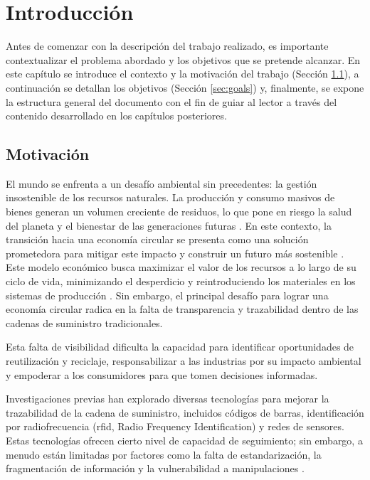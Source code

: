 \chapter[Introducción]{Introducción}
\label{cp:introduction}

\parindent0pt

Antes de comenzar con la descripción del trabajo realizado, es importante contextualizar el problema abordado y los objetivos que se pretende alcanzar. En este capítulo se introduce el contexto y la motivación del trabajo (Sección \ref{sec:motivation}), a continuación se detallan los objetivos (Sección \ref{sec:goals}) y, finalmente, se expone la estructura general del documento con el fin de guiar al lector a través del contenido desarrollado en los capítulos posteriores.

\section{Motivación}
\label{sec:motivation}

El mundo se enfrenta a un desafío ambiental sin precedentes: la gestión insostenible de los recursos naturales. La producción y consumo masivos de bienes generan un volumen creciente de residuos, lo que pone en riesgo la salud del planeta y el bienestar de las generaciones futuras \cite{IPCC2022, pelegri2021ipcc}. En este contexto, la transición hacia una economía circular se presenta como una solución prometedora para mitigar este impacto y construir un futuro más sostenible \cite{clima2022book}. Este modelo económico busca maximizar el valor de los recursos a lo largo de su ciclo de vida, minimizando el desperdicio y reintroduciendo los materiales en los sistemas de producción \cite{da2022economia, melendez2021economia}. Sin embargo, el principal desafío para lograr una economía circular radica en la falta de transparencia y trazabilidad dentro de las cadenas de suministro tradicionales.

Esta falta de visibilidad dificulta la capacidad para identificar oportunidades de reutilización y reciclaje, responsabilizar a las industrias por su impacto ambiental y empoderar a los consumidores para que tomen decisiones informadas. 

Investigaciones previas han explorado diversas tecnologías para mejorar la trazabilidad de la cadena de suministro, incluidos códigos de barras, identificación por radiofrecuencia (\gls{rfid}, Radio Frequency Identification) y redes de sensores. Estas tecnologías ofrecen cierto nivel de capacidad de seguimiento; sin embargo, a menudo están limitadas por factores como la falta de estandarización, la fragmentación de información y la vulnerabilidad a manipulaciones \cite{schuitemaker2020product}.

